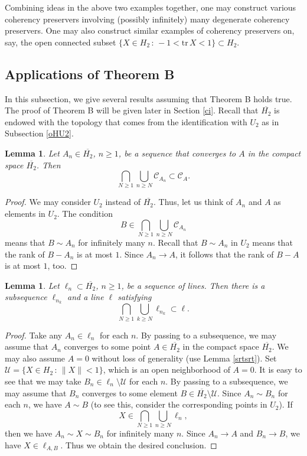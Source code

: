 \documentclass[10pt]{amsart}
\newtheorem{lemma}[theorem]{Lemma}
\theoremstyle{definition}
\theoremstyle{remark}
\numberwithin{subsection}{section}
\numberwithin{equation}{section}
\newcommand\cC{{\mathcal{C}}}
\newcommand\oH{{\overline{H_2}}}
\begin{document}
Combining ideas in the above two examples together, one may construct various coherency preservers involving (possibly infinitely) many degenerate coherency preservers.
One may also construct similar examples of coherency preservers on, say, the open connected subset $\{X\in H_2\,:\, -1<\mathrm{tr}\,X<1\}\subset H_2$.





\subsection{Applications of Theorem B}\label{applici}
In this subsection, we give several results assuming that Theorem B holds true. 
The proof of Theorem B will be given later in Section \ref{ci}.
Recall that $\oH$ is endowed with the topology that comes from the identification with $U_2$ as in Subsection \ref{oHU2}. 

\begin{lemma}\label{ccc}
Let $A_n\in \oH$, $n\geq 1$, be a sequence that converges to $A$ in the compact space $\oH$. 
Then 
\[
\bigcap_{N\geq 1}\bigcup_{n\geq N} \mathcal{C}_{A_n}\subset \cC_A.
\]
\end{lemma}
\begin{proof}
We may consider $U_2$ instead of $\oH$. 
Thus, let us think of $A_n$ and $A$ as elements in $U_2$.
The condition
\[
B\in \bigcap_{N\geq 1}\bigcup_{n\geq N} \mathcal{C}_{A_n}
\] 
means that $B\sim A_n$ for infinitely many $n$. 
Recall that $B\sim A_n$ in $U_2$ means that the rank of $B-A_n$ is at most $1$. 
Since $A_n\to A$, it follows that the rank of $B-A$ is at most $1$, too. 
\end{proof}


\begin{lemma}\label{elln}
Let $\ell_n\subset \oH$, $n\geq 1$, be a sequence of lines. 
Then there is a subsequence $\ell_{n_k}$ and a line $\ell$ satisfying
\[
\bigcap_{N\geq 1}\bigcup_{k\geq N} \ell_{n_k}\subset \ell.
\]
\end{lemma}
\begin{proof}
Take any $A_n\in \ell_n$ for each $n$. 
By passing to a subsequence, we may assume that $A_n$ converges to some point $A\in \oH$ in the compact space $\oH$. 
We may also assume $A=0$ without loss of generality (use Lemma \ref{srtsrt}). 
Set $\mathcal{U}=\{X\in H_2\,:\, \| X\| <1\}$, which is an open neighborhood of $A=0$. 
It is easy to see that we may take $B_n\in \ell_n\setminus \mathcal{U}$ for each $n$. 
By passing to a subsequence, we may assume that $B_n$ converges to some element $B\in \oH\setminus \mathcal{U}$. 
Since $A_n\sim B_n$ for each $n$, we have $A\sim B$ (to see this, consider the corresponding points in $U_2$). 
If 
\[
X\in \bigcap_{N\geq 1}\bigcup_{n\geq N} \ell_{n},
\]
then we have $A_n\sim X\sim B_n$ for infinitely many $n$. 
Since $A_n\to A$ and $B_n\to B$, we have $X\in \ell_{A,B}$.
Thus we obtain the desired conclusion.
\end{proof}
\end{document}
